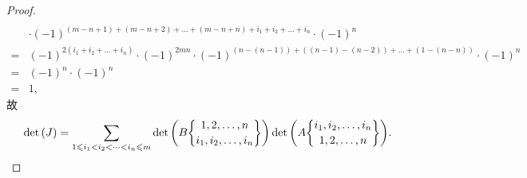 \documentclass[../libro.tex]{subfiles}
\begin{document}
\begin{proof}
\begin{align*}
        \\
        &
        \cdot
        (-1)^{(m-n+1) + (m-n+2) + \dots + (m-n+n)
        + i_1 + i_2 + \dots + i_n}
        \cdot
        (-1)^n
        \\
        = {} & (-1)^{2(i_1+i_2+\dots+i_n)}
        \cdot (-1)^{2mn}
        \cdot (-1)^{(n-(n-1))+((n-1)-(n-2))+\dots+(1-(n-n))}
        \cdot (-1)^{n}
        \\
        = {} & (-1)^n \cdot (-1)^n
        \\
        = {} & 1,
    \end{align*}
    故
    \begin{align*}
        \det {(J)}
        = \sum_{1 \leq i_1 < i_2 < \dots < i_n \leq m}
        {\det {\left(
                    B
                    \submat{1,2,\dots,n}{i_1,i_2,\dots,i_n}
            \right)}
            \det {\left(
                    A\submat{i_1,i_2,\dots,i_n}{1,2,\dots,n}
        \right)}}.
    \end{align*}


\end{proof}
\end{document}

